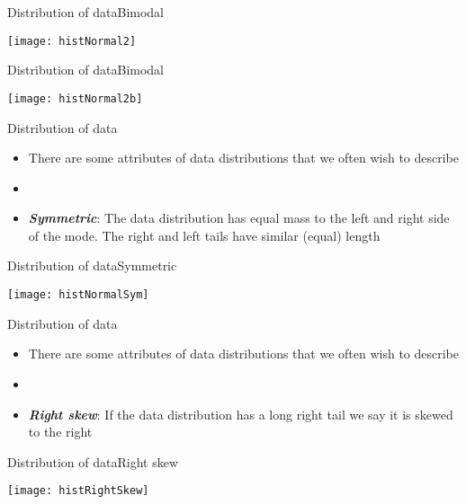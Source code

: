 \documentclass[xcolor=dvipsnames]{beamer}
\begin{document}
\begin{frame}{Distribution of data}{Bimodal}
	\begin{center}
		\texttt{[image: histNormal2]}
	\end{center}
\end{frame}

\begin{frame}{Distribution of data}{Bimodal}
	\begin{center}
			\texttt{[image: histNormal2b]}
	\end{center}
\end{frame}

\begin{frame}{Distribution of data}
	\begin{itemize}
		\item There are some attributes of data distributions that we often wish to describe
		\item[]
		\item \textbf{\emph{Symmetric}}: The data distribution has equal mass to the left and right side of the mode. The right and left tails have similar (equal) length
	\end{itemize}
\end{frame}

\begin{frame}{Distribution of data}{Symmetric}
	\begin{center}
		\texttt{[image: histNormalSym]}
	\end{center}
\end{frame}

\begin{frame}{Distribution of data}
	\begin{itemize}
		\item There are some attributes of data distributions that we often wish to describe
		\item[]
		\item \textbf{\emph{Right skew}}: If the data distribution has a long right tail we say it is skewed to the right
	\end{itemize}
\end{frame}

\begin{frame}{Distribution of data}{Right skew}
	\begin{center}
		\texttt{[image: histRightSkew]}
	\end{center}
\end{frame}
\end{document}
